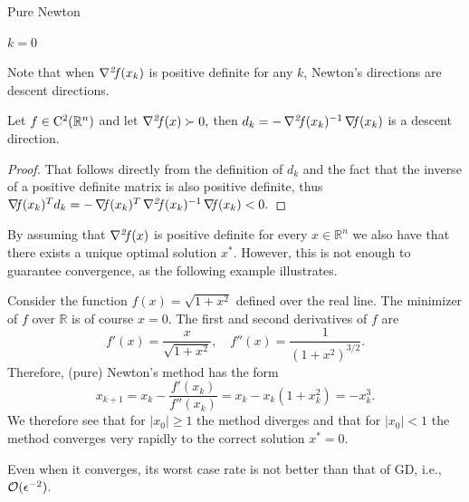 \documentclass[10pt,a4paper]{article}
\begin{document}
	\begin{algorithm}[H]\label{alg:newton}
		\caption{Pure Newton}
		
		
		$k = 0$
		
	\end{algorithm}
\noindent Note that when $\operatorname*{\mathit{\nabla^2 \!f}}(x_k)$ is positive definite for any $k$, Newton's directions are descent directions.
\begin{lemma}
	Let $f\in \mathord{\mathrm{C^2}}(\mathbb{R}^n)$ and let $\operatorname*{\mathit{\nabla^2 \!f}}(x)\succ0,$ then $d_k = - \operatorname*{\mathit{\nabla^2 \!f}}(x_k)^{-1} \operatorname*{\mathit{\nabla \!f}}(x_k)$ is a descent direction.
\end{lemma}
\begin{proof}
	That follows directly from the definition of $d_k$ and the fact that the inverse of a positive definite matrix is also positive definite, thus
	$\operatorname*{\mathit{\nabla \!f}}(x_k)^Td_k = - \operatorname*{\mathit{\nabla \!f}}(x_k)^T \operatorname*{\mathit{\nabla^2 \!f}}(x_k)^{-1} \operatorname*{\mathit{\nabla \!f}}(x_k)<0.$ 
\end{proof}
\noindent By assuming that $\operatorname*{\mathit{\nabla^2 \!f}}(x)$ is positive definite for every $x \in \mathbb{R}^n$ we also have that there exists a unique optimal solution $x^*$. However, this is not enough to guarantee convergence, as the following example illustrates.

\begin{example}
	Consider the function $f(x) = \sqrt{1 + x^2}$ defined over the real line. The minimizer of $f$ over $\mathbb{R}$ is of course $x = 0$. The first and second derivatives of $f$ are
	\begin{equation*}
		f'(x) = \frac{x}{\sqrt{1 + x^2}}, \quad f''(x) = \frac{1}{(1 + x^2)^{3/2}}.
	\end{equation*}
	Therefore, (pure) Newton's method has the form
	\begin{equation*}
		x_{k+1} = x_k - \frac{f'(x_k)}{f''(x_k)} = x_k - x_k(1 + x_k^2) = -x_k^3.
	\end{equation*}
	We therefore see that for $|x_0| \geq 1$ the method diverges and that for $|x_0| < 1$ the method converges very rapidly to the correct solution $x^* = 0$.
\end{example}
\noindent Even when it converges, its worst case rate is not better than that of GD, i.e., $\mathcal{O}(\epsilon^{-2})$.
\end{document}

